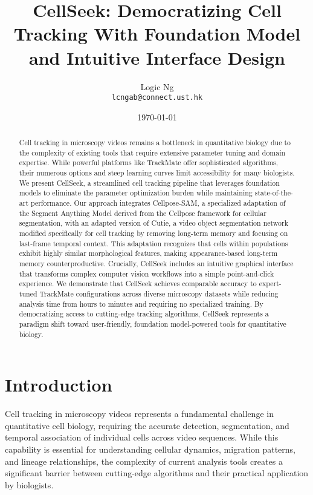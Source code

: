\documentclass[12pt]{article}
\title{CellSeek: Democratizing Cell Tracking With Foundation Model and Intuitive Interface Design}
\author{Logic Ng\\ \texttt{lcngab@connect.ust.hk}}
\date{\today}
\begin{document}
\maketitle

\begin{abstract}
  Cell tracking in microscopy videos remains a bottleneck in quantitative biology due to the complexity of existing tools that require extensive parameter tuning and domain expertise. While powerful platforms like TrackMate offer sophisticated algorithms, their numerous options and steep learning curves limit accessibility for many biologists. We present CellSeek, a streamlined cell tracking pipeline that leverages foundation models to eliminate the parameter optimization burden while maintaining state-of-the-art performance. Our approach integrates Cellpose-SAM, a specialized adaptation of the Segment Anything Model derived from the Cellpose framework for cellular segmentation, with an adapted version of Cutie, a video object segmentation network modified specifically for cell tracking by removing long-term memory and focusing on last-frame temporal context. This adaptation recognizes that cells within populations exhibit highly similar morphological features, making appearance-based long-term memory counterproductive. Crucially, CellSeek includes an intuitive graphical interface that transforms complex computer vision workflows into a simple point-and-click experience. We demonstrate that CellSeek achieves comparable accuracy to expert-tuned TrackMate configurations across diverse microscopy datasets while reducing analysis time from hours to minutes and requiring no specialized training. By democratizing access to cutting-edge tracking algorithms, CellSeek represents a paradigm shift toward user-friendly, foundation model-powered tools for quantitative biology.
\end{abstract}

\section{Introduction}

Cell tracking in microscopy videos represents a fundamental challenge in quantitative cell biology, requiring the accurate detection, segmentation, and temporal association of individual cells across video sequences. While this capability is essential for understanding cellular dynamics, migration patterns, and lineage relationships, the complexity of current analysis tools creates a significant barrier between cutting-edge algorithms and their practical application by biologists.
\end{document}
